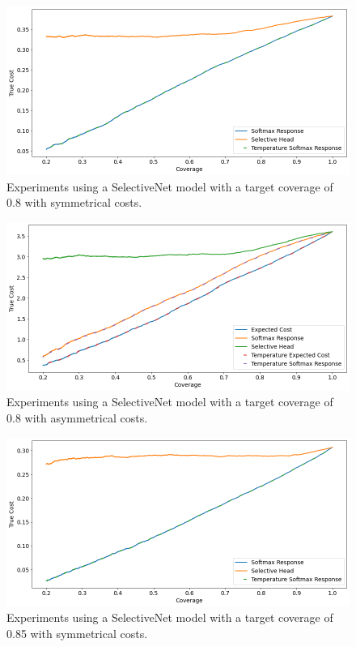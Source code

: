 \begin{figure}[h]
	\includegraphics[width=\textwidth]{images/multi-class/sn0.8-sym.png}
	\caption*{Experiments using a SelectiveNet model with a target coverage of 0.8 with symmetrical costs.}
\end{figure}

\begin{figure}[h]
	\includegraphics[width=\textwidth]{images/multi-class/sn0.8-asym.png}
	\caption*{Experiments using a SelectiveNet model with a target coverage of 0.8 with asymmetrical costs.}
\end{figure}

\begin{figure}[h]
	\includegraphics[width=\textwidth]{images/multi-class/sn0.85-sym.png}
	\caption*{Experiments using a SelectiveNet model with a target coverage of 0.85 with symmetrical costs.}
\end{figure}

